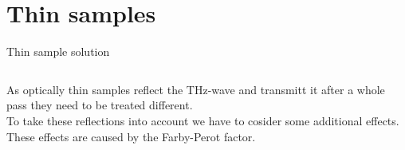 \documentclass[aspectratio=1610, 9pt]{beamer}
\begin{document}
\section{Thin samples}
\begin{frame}{Thin sample solution}
  \begin{columns}
    \begin{column}{0.5\textwidth}
      As optically thin samples reflect the THz-wave and transmitt it after a whole pass they need to be treated different.\\
      To take these reflections into account we have to cosider some additional effects.\\
      These effects are caused by the Farby-Perot factor.
    \end{column}
  \end{columns}
\end{frame}

\end{document}
